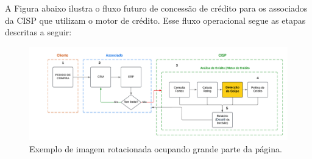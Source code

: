 \documentclass[12pt,a4paper]{article}
\begin{document}
A Figura abaixo ilustra o fluxo futuro de concess\~{a}o de cr\'edito para os associados da CISP que utilizam o motor de cr\'edito. Esse fluxo operacional segue as etapas descritas a seguir:

\begin{figure}[H]
    \centering
    \includegraphics[angle=90, width=0.4\textheight]{diagrama.png}
    \caption{Exemplo de imagem rotacionada ocupando grande parte da p\'agina.}
    \label{fig:imagem_rotacionada}
\end{figure}
\end{document}

